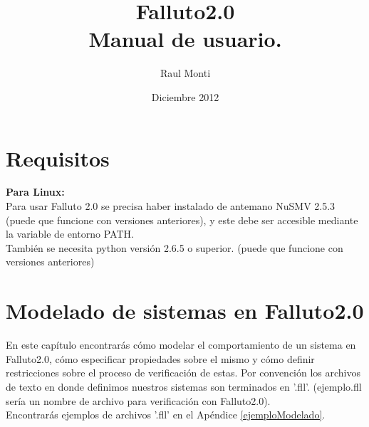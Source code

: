 \documentclass[titlepage, 12pt]{book}
\title{Falluto2.0 \\ Manual de usuario.}
\author{Raul Monti}
\date{Diciembre 2012}
\begin{document}
\maketitle

\newpage
\tableofcontents



\chapter{Requisitos}
\textbf{Para Linux:}\\

Para usar Falluto 2.0 se precisa haber instalado de antemano NuSMV 2.5.3 (puede que funcione con versiones anteriores), y este debe ser accesible mediante la variable de entorno PATH.\\

Tambi\'en se necesita python versión 2.6.5 o superior. (puede que funcione con versiones anteriores)



\chapter{Modelado de sistemas en Falluto2.0}
En este cap\'itulo encontrar\'as c\'omo modelar el comportamiento de un sistema en Falluto2.0, c\'omo especificar propiedades sobre el mismo y c\'omo definir restricciones sobre el proceso de verificaci\'on de estas.
Por convenci\'on los archivos de texto en donde definimos nuestros sistemas son terminados en '.fll'. (ejemplo.fll ser\'ia un nombre de archivo para verificaci\'on con Falluto2.0).\\
\indent Encontrar\'as ejemplos de archivos '.fll' en el Ap\'endice \ref{ejemploModelado}.


\end{document}

